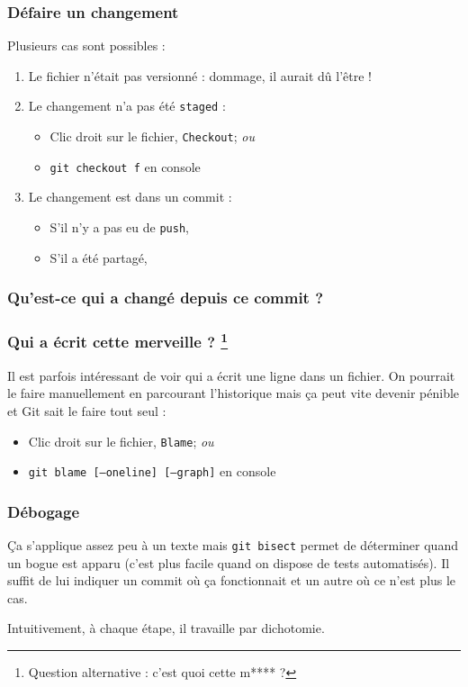 \documentclass[compress]{beamer}
\begin{document}
\begin{frame}
	\frametitle{Défaire un changement}\label{s:undo}
	Plusieurs cas sont possibles :
	\begin{enumerate}
		\item Le fichier n'était pas versionné : dommage, il aurait dû l'être !
		\item Le changement n'a pas été \texttt{staged} :
			\begin{itemize}
				\item Clic droit sur le fichier, \texttt{Checkout}; \textit{ou} %
				\item \texttt{git checkout f} en console
			\end{itemize}
		\item Le changement est dans un commit :
			\begin{itemize}
				\item S'il n'y a pas eu de \texttt{push}, %
				\item S'il a été partagé, %
			\end{itemize}
	\end{enumerate}
\end{frame}

\begin{frame}
	\frametitle{Qu'est-ce qui a changé depuis ce commit ?}
\end{frame}

\begin{frame}
	\frametitle{Qui a écrit cette merveille ?
	\footnote{Question alternative : c'est quoi cette m**** ?}}

	Il est parfois intéressant de voir qui a écrit une ligne dans un fichier.
	On pourrait le faire manuellement en parcourant l'historique mais ça peut
	vite devenir pénible et Git sait le faire tout seul :

	\begin{itemize}
		\item Clic droit sur le fichier, \texttt{Blame}; \textit{ou} %
		\item \texttt{git blame [--oneline] [--graph]} en console
	\end{itemize}
\end{frame}

\begin{frame}
	\frametitle{Débogage}
	Ça s'applique assez peu à un texte mais \texttt{git bisect} permet de
	déterminer quand un bogue est apparu (c'est plus facile quand on dispose de
	tests automatisés). Il suffit de lui indiquer un commit où ça fonctionnait
	et un autre où ce n'est plus le cas.

	Intuitivement, à chaque étape, il travaille par dichotomie.
\end{frame}
\end{document}
